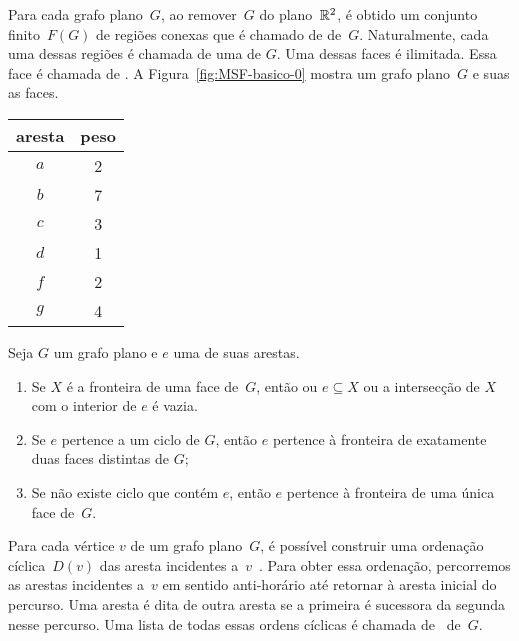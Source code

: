 Para cada grafo plano~$G$, ao remover~$G$ do plano~$\mathbb{R}^2$, é obtido um conjunto finito~$F(G)$ de regiões conexas que é chamado de  de~$G$.
Naturalmente, cada uma dessas regiões é chamada de uma  de $G$.
Uma dessas faces é ilimitada.
Essa face é chamada de .
A Figura~\ref{fig:MSF-basico-0} mostra um grafo plano~$G$ e suas as faces.

\begin{minipage}[b]{0.4\textwidth}
\centering
\begin{tabular}{| c  c |} 
 \hline
 aresta & peso\\
 \hline
 $a$ & 2 \\ 
 \hline
$b$ & 7 \\
 \hline
$c$ & 3 \\
 \hline
$d$ & 1 \\
 \hline
$f$ & 2 \\
 \hline
$g$ & 4 \\
 \hline
\end{tabular}
\end{minipage}
\hfill
\begin{minipage}[b]{0.6\textwidth}
\scalebox{1.5}{
  \centering
  
  }
 \label{fig:MSF-basico-0}
\end{minipage}

\begin{lemma}
\label{lemma:diestel}
Seja $G$ um grafo plano e $e$ uma de suas arestas.
\begin{enumerate}
\item Se $X$ é a fronteira de uma face de~$G$, então ou $e\subseteq X$ ou a intersecção de $X$ com o interior de $e$ é vazia.
\item Se $e$ pertence a um ciclo de $G$, então $e$ pertence à fronteira de exatamente duas faces distintas de $G$;
\item Se não existe ciclo que contém $e$, então $e$ pertence à fronteira de uma única face de~$G$.
\end{enumerate}
\end{lemma}

Para cada vértice $v$ de um grafo plano~$G$, é possível construir uma ordenação cíclica~$D(v)$ das aresta incidentes a~$v$~\cite{noma2003}.
Para obter essa ordenação, percorremos as arestas incidentes a~$v$ em sentido anti-horário até retornar à aresta inicial do percurso.
Uma aresta é dita  de outra aresta se a primeira é sucessora da segunda nesse percurso.
Uma lista de todas essas ordens cíclicas é chamada de~ de~$G$.

